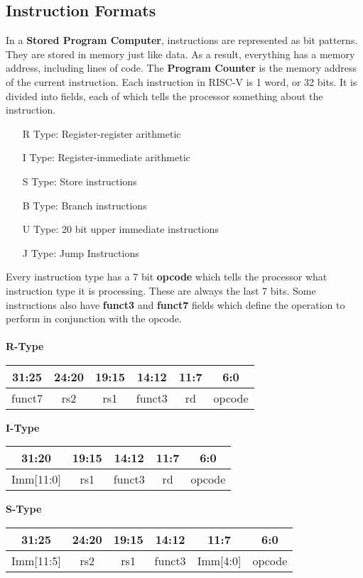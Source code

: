 \documentclass{article}
\begin{document}
\subsection{Instruction Formats}
In a \textbf{Stored Program Computer}, instructions are represented as bit patterns. They are stored in
memory just like data. As a result, everything has a memory address, including lines of code. The \textbf{Program Counter}
is the memory address of the current instruction. Each instruction in RISC-V is 1 word, or 32 bits.
It is divided into fields, each of which tells the processor something about the instruction.
\begin{itemize}
    \item[R Type:] Register-register arithmetic 
    \item[I Type:] Register-immediate arithmetic
    \item[S Type:] Store instructions
    \item[B Type:] Branch instructions
    \item[U Type:] 20 bit upper immediate instructions
    \item[J Type:] Jump Instructions    
\end{itemize}
Every instruction type has a 7 bit \textbf{opcode} which tells the processor what instruction type it is processing.
These are always the last 7 bits. Some instructions also have \textbf{funct3} and \textbf{funct7} fields which define
the operation to perform in conjunction with the opcode.\\\\
\textbf{R-Type}
\begin{center}
    \begin{tabular}{|c|c|c|c|c|c|}
        31:25& 24:20& 19:15& 14:12 & 11:7 & 6:0\\
        \hline
        funct7 & rs2 & rs1 & funct3 & rd & opcode\\
        \hline
    \end{tabular}
\end{center}
\textbf{I-Type}
\begin{center}
    \begin{tabular}{|c|c|c|c|c|}
        31:20& 19:15& 14:12 & 11:7 & 6:0\\
        \hline
        Imm[11:0] & rs1 & funct3 & rd & opcode\\
        \hline
    \end{tabular}
\end{center}
\textbf{S-Type}
\begin{center}
    \begin{tabular}{|c|c|c|c|c|c|}
        31:25 & 24:20 & 19:15 & 14:12 & 11:7 & 6:0\\
        \hline
        Imm[11:5] & rs2 & rs1 & funct3 & Imm[4:0] & opcode\\
        \hline
    \end{tabular}
\end{center}
\end{document}
